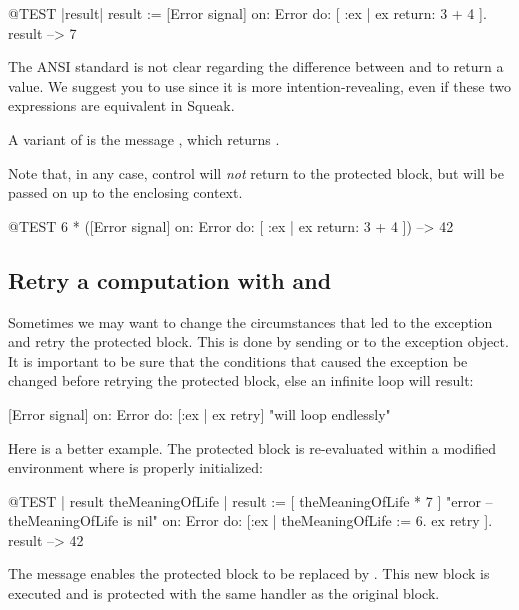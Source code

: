 \documentclass[a4paper,10pt,twoside]{book}
\begin{document}
\begin{code}{@TEST |result|}
result := [Error signal]
	on: Error
	do: [ :ex | ex return: 3 + 4 ].
result --> 7
\end{code}

The ANSI standard is not clear regarding the difference between  and  to return a value. We suggest you to use  since it is more intention-revealing, even if these two expressions are equivalent in Squeak.

A variant of  is the message , which returns . 

Note that, in any case, control will \emph{not} return to the protected block, but will be passed on up to the enclosing context.

\begin{code}{@TEST}
6 * ([Error signal] on: Error do: [ :ex | ex return: 3 + 4 ]) --> 42
\end{code}

\subsection{Retry a computation with  and }

Sometimes we may want to change the circumstances that led to the exception and retry the protected block. This is done by sending  or  to the exception object. It is important to be sure that the conditions that caused the exception be changed before retrying the protected block, else an infinite  loop will result:
\begin{code}{}
[Error signal] on: Error do: [:ex | ex retry]    "will loop endlessly"
\end{code}

Here is a better example.
The protected block is re-evaluated within a modified environment where  is properly initialized:
\begin{code}{@TEST | result theMeaningOfLife |}
result := [ theMeaningOfLife * 7 ]    "error -- theMeaningOfLife is nil"
	on: Error
	do: [:ex | theMeaningOfLife := 6. ex retry ].
result --> 42
\end{code}

The message  enables the protected block to be replaced by . This new block is executed and is protected with the same handler as the original block.
\end{document}
